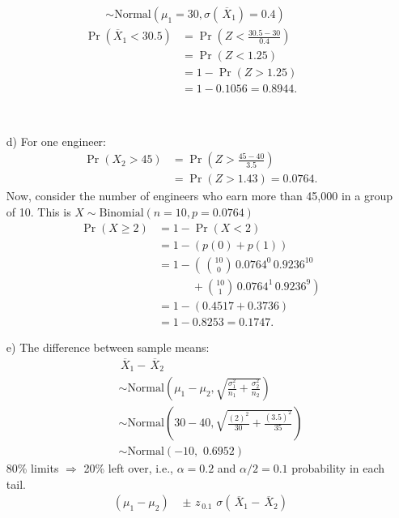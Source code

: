 \documentclass[12pt]{article}
\begin{document}
{\begin{minipage}[t]{0.98\textwidth}
\begin{minipage}[t]{0.47\textwidth}
\begin{enumerate}[a)]
\begin{align*}
&\sim \text{Normal}\left(\mu_1=30,\sigma(\,\overline{\!X}_1) =0.4\right)
\end{align*}
\begin{align*}
\Pr(\overline{\!X}_1 < 30.5) &= \Pr(Z < \tfrac{30.5-30}{0.4}) \\
&= \Pr(Z < 1.25) \\
&= 1 - \Pr(Z > 1.25) \\
&= 1 - 0.1056 = 0.8944.
\end{align*}
\end{enumerate}
\end{minipage}\hspace{0.04\textwidth}
\begin{minipage}[t]{0.47\textwidth}
\quad\\[-1cm]
\begin{enumerate}
\item[d)] For one engineer:
\begin{align*}
\Pr(X_2 > 45) &= \Pr(Z > \tfrac{45-40}{3.5}) \\
&= \Pr(Z > 1.43) = 0.0764.
\end{align*}
Now, consider the number of engineers who earn more than 45,000 in a group of 10. This is $X \sim \text{Binomial}(n=10, p =0.0764)$
\begin{align*}
\Pr(X \ge 2) &= 1 - \Pr(X < 2) \\
&= 1 - (p(0) + p(1)) \\
&= 1 - \left(\,\binom{10}{0}\,0.0764^0\,0.9236^{10}\right.\\
&\qquad\quad+ \left.\binom{10}{1}\,0.0764^1\,0.9236^{9}\right)\\
&= 1 - (0.4517+0.3736)\\
&= 1 - 0.8253= 0.1747.
\end{align*}
\item[e)] The difference between sample means:
\begin{align*}
&\,\overline{\!X}_1 - \,\overline{\!X}_2 \\
\quad&\sim \text{Normal}\left(\mu_1-\mu_2,\sqrt{\frac{\sigma_1^2}{n_1}+\frac{\sigma_2^2}{n_2}}\right)\\
\quad&\sim \text{Normal}\left(30-40,\sqrt{\frac{(2)^2}{30}+\frac{(3.5)^2}{35}}\right)\\
\quad&\sim \text{Normal}\left(-10,\,\,0.6952\right)
\end{align*}
80\% limits $\Rightarrow$ 20\% left over, i.e., $\alpha=0.2$ and $\alpha/2=0.1$ probability in each tail.
\begin{align*}
(\mu_1-\mu_2) \,\,  &\pm \,\, z_{\,0.1}\,\, \sigma(\,\overline{\!X}_1-\,\overline{\!X}_2) \\[0.2cm]

\end{align*}
\end{enumerate}
\end{minipage}
\end{minipage}}
\end{document}
